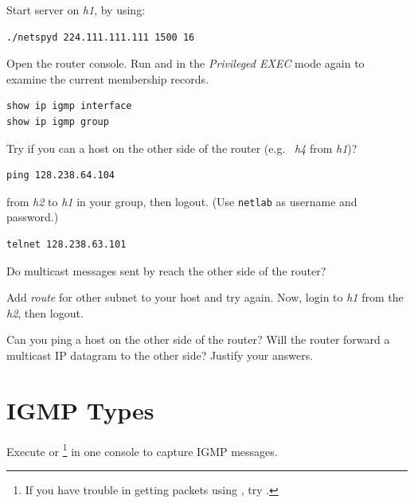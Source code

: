 \documentclass{../UTNetLab}
\begin{document}
Start  server on \textit{h1}, by using:
\begin{lstlisting}
./netspyd 224.111.111.111 1500 16
\end{lstlisting}

Open the router console.
Run  and  in the \textit{Privileged EXEC} mode again to examine the current membership records.

\begin{lstlisting}
show ip igmp interface
show ip igmp group
\end{lstlisting}

Try if you can  a host on the other side of the router (e.g.\  \textit{h4} from \textit{h1})?

\begin{lstlisting}
ping 128.238.64.104
\end{lstlisting}

 from \textit{h2} to \textit{h1} in your group, then logout. (Use \texttt{netlab} as username and password.)

\begin{lstlisting}
telnet 128.238.63.101
\end{lstlisting}
Do multicast messages sent by  reach the other side of the router?

Add \textit{route} for other subnet to your host and try  again.
Now, login to \textit{h1} from the \textit{h2}, then logout.

\begin{report}
    \item Can you ping a host on the other side of the router?
    Will the router forward a multicast IP datagram to the other side?
    Justify your answers.
\end{report}

\section{IGMP Types}
Execute  or \footnote{If you have trouble in getting packets using , try .} in one console to capture IGMP messages.
\end{document}
